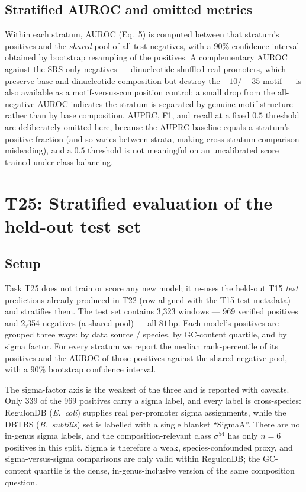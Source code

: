 \documentclass{article}
\begin{document}
\subsection{Stratified AUROC and omitted metrics}
Within each stratum, AUROC (Eq.~5) is computed between that stratum's positives and the \emph{shared} pool of all test negatives, with a $90\%$ confidence interval obtained by bootstrap resampling of the positives. A complementary AUROC against the SRS-only negatives --- dinucleotide-shuffled real promoters, which preserve base and dinucleotide composition but destroy the $-10/-35$ motif --- is also available as a motif-versus-composition control: a small drop from the all-negative AUROC indicates the stratum is separated by genuine motif structure rather than by base composition. AUPRC, F1, and recall at a fixed $0.5$ threshold are deliberately omitted here, because the AUPRC baseline equals a stratum's positive fraction (and so varies between strata, making cross-stratum comparison misleading), and a $0.5$ threshold is not meaningful on an uncalibrated score trained under class balancing.

\section{T25: Stratified evaluation of the held-out test set}

\subsection{Setup}
Task T25 does not train or score any new model; it re-uses the held-out T15 \emph{test} predictions already produced in T22 (row-aligned with the T15 test metadata) and stratifies them. The test set contains 3,323 windows --- 969 verified positives and 2,354 negatives (a shared pool) --- all $81$\,bp. Each model's positives are grouped three ways: by data source / species, by GC-content quartile, and by sigma factor. For every stratum we report the median rank-percentile of its positives and the AUROC of those positives against the shared negative pool, with a $90\%$ bootstrap confidence interval.

The sigma-factor axis is the weakest of the three and is reported with caveats. Only 339 of the 969 positives carry a sigma label, and every label is cross-species: RegulonDB (\emph{E.\ coli}) supplies real per-promoter sigma assignments, while the DBTBS (\emph{B.\ subtilis}) set is labelled with a single blanket ``SigmaA''. There are no in-genus sigma labels, and the composition-relevant class $\sigma^{54}$ has only $n=6$ positives in this split. Sigma is therefore a weak, species-confounded proxy, and sigma-versus-sigma comparisons are only valid within RegulonDB; the GC-content quartile is the dense, in-genus-inclusive version of the same composition question.
\end{document}
